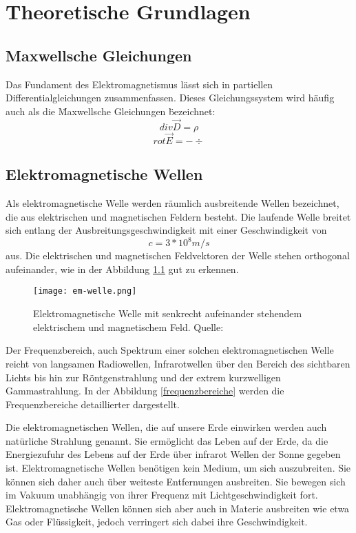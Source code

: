 
\chapter{Theoretische Grundlagen}
\section{Maxwellsche Gleichungen}
Das Fundament des Elektromagnetismus lässt sich in partiellen Differentialgleichungen zusammenfassen. Dieses Gleichungssystem wird häufig auch als die \" Maxwellsche Gleichungen \" bezeichnet:
\[div \vec{D} = \rho\]
\[rot \vec{E} = -\div{}\]
\section{Elektromagnetische Wellen}
Als elektromagnetische Welle werden räumlich ausbreitende Wellen bezeichnet, die aus elektrischen und magnetischen Feldern besteht. Die laufende Welle breitet sich entlang der Ausbreitungsgeschwindigkeit mit einer Geschwindigkeit von \[c= 3*10^8 m/s\] aus. Die elektrischen und magnetischen Feldvektoren der Welle stehen orthogonal aufeinander, wie in der Abbildung \ref{elektromagnetische Welle} gut zu erkennen.

\begin{figure}[ht]
	\centering
	\texttt{[image: em-welle.png]}
	\caption[Elektromagnetische Welle mit senkrecht
	aufeinander stehendem elektrischem und magnetischem Feld]{Elektromagnetische Welle mit senkrecht aufeinander stehendem elektrischem und magnetischem Feld. Quelle: \cite[Harten, S. 130]{Harten:2017}} 
	\label{elektromagnetische Welle}
\end{figure}

Der Frequenzbereich, auch Spektrum einer solchen elektromagnetischen Welle reicht von langsamen Radiowellen, Infrarotwellen über den Bereich des sichtbaren Lichts bis hin zur Röntgenstrahlung und der extrem kurzwelligen Gammastrahlung. In der Abbildung \ref{frequenzbereiche} werden die Frequenzbereiche detaillierter dargestellt.

Die elektromagnetischen Wellen, die auf unsere Erde einwirken werden auch natürliche Strahlung genannt. Sie ermöglicht das Leben auf der Erde, da die Energiezufuhr des Lebens auf der Erde über infrarot Wellen der Sonne gegeben ist.
Elektromagnetische Wellen benötigen kein Medium, um sich auszubreiten. Sie können sich daher auch über weiteste Entfernungen ausbreiten. Sie bewegen sich im Vakuum unabhängig von ihrer Frequenz mit Lichtgeschwindigkeit fort. Elektromagnetische Wellen können sich aber auch in Materie ausbreiten wie etwa Gas oder Flüssigkeit, jedoch verringert sich dabei ihre Geschwindigkeit.

